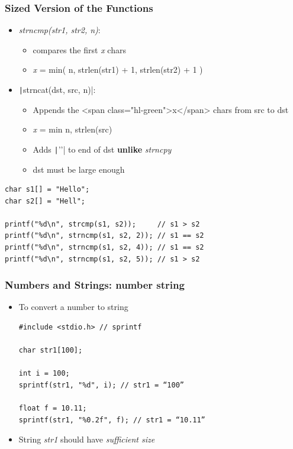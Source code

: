 \documentclass{../c-lecture}
\begin{document}
\begin{frame}
  \frametitle{Sized Version of the Functions}
  \begin{itemize}
    \item \textit{\color{YellowOrange}strncmp(str1, str2, n)}:
    \begin{itemize}
      \item compares the first \textit{\color{LimeGreen}x} chars
      \item
        \textit{\color{LimeGreen} x} = min( n, strlen(str1) + 1,
        strlen(str2) + 1 )

    \end{itemize}
    \item \texttt|strncat(dst, src, n)|:
    \begin{itemize}
      \item
        Appends the <span class="hl-green">x</span> chars from src to dst

      \item \textit{\color{RubineRed} x} = min{ n, strlen(src) }
      \item
        Adds \texttt|'\0'| to end of dst \textbf{\color{RubineRed} unlike}
        \textit{\color{Cyan} strncpy}

      \item dst must be large enough
    \end{itemize}
  \end{itemize}
\end{frame}

\begin{frame}[fragile]
  \begin{verbatim}
char s1[] = "Hello";
char s2[] = "Hell";

printf("%d\n", strcmp(s1, s2));     // s1 > s2
printf("%d\n", strncmp(s1, s2, 2)); // s1 == s2
printf("%d\n", strncmp(s1, s2, 4)); // s1 == s2
printf("%d\n", strncmp(s1, s2, 5)); // s1 > s2
  \end{verbatim}
\end{frame}

\begin{frame}[fragile]
  \frametitle{Numbers and Strings: number \textrightarrow string}
  \begin{itemize}
    \item To convert a number to string
    \begin{verbatim}
#include <stdio.h> // sprintf

char str1[100];

int i = 100;
sprintf(str1, "%d", i); // str1 = “100”

float f = 10.11;
sprintf(str1, "%0.2f", f); // str1 = “10.11”

    \end{verbatim}
    \item
      String \textit{\color{YellowOrange} str1} should have
      \textit{\color{CarnationPink} sufficient size}

  \end{itemize}
\end{frame}
\end{document}
